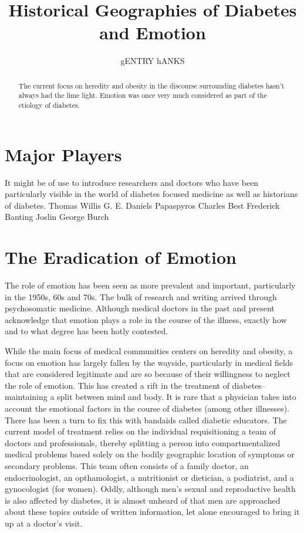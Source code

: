 \documentclass[12pt]{article}
\title{Historical Geographies of Diabetes and Emotion}
\author{gENTRY hANKS}
\begin{document}
\maketitle


\newpage
\begin{abstract}
\singlespacing 
The current focus on heredity and obesity in the discourse surrounding diabetes hasn't always had the lime light. Emotion was once very much considered as part of the etiology of diabetes. 

\end{abstract}

\newpage
\section{Major Players}
It might be of use to introduce researchers and doctors who have been particularly visible in the world of diabetes focused medicine as well as historians of diabetes. 
Thomas Willis
G. E. Daniels
Papaspyros
Charles Best
Frederick Banting
Joslin
George Burch

\section{The Eradication of Emotion} 
\doublespacing
The role of emotion has been seen as more prevalent and important, particularly in the 1950s, 60s and 70s. The bulk of research and writing arrived through psychosomatic medicine. Although medical doctors in the past and present acknowledge that emotion plays a role in the course of the illness, exactly how and to what degree has been hotly contested.  

While the main focus of medical communities centers on heredity and obesity, a focus on emotion has largely fallen by the wayside, particularly in medical fields that are considered legitimate and are so because of their willingness to neglect the role of emotion. This has created a rift in the treatment of diabetes-- maintaining a split between mind and body. 
It is rare that a physician takes into account the emotional factors in the course of diabetes (among other illnesses). There has been a turn to fix this with bandaids called diabetic educators. The current model of treatment relies on the individual requisitioning a team of doctors and professionals, thereby splitting a person into compartmentalized medical problems based solely on the bodily geographic location of symptoms or secondary problems. This team often consists of a family doctor, an endocrinologist, an opthamologist, a nutritionist or dietician, a podiatrist, and a gynocologist (for women). Oddly, although men's sexual and reproductive health is also affected by diabetes, it is almost unheard of that men are approached about these topics outside of written information, let alone encouraged to bring it up at a doctor's visit. 

\newpage
\singlespacing


\end{document}
